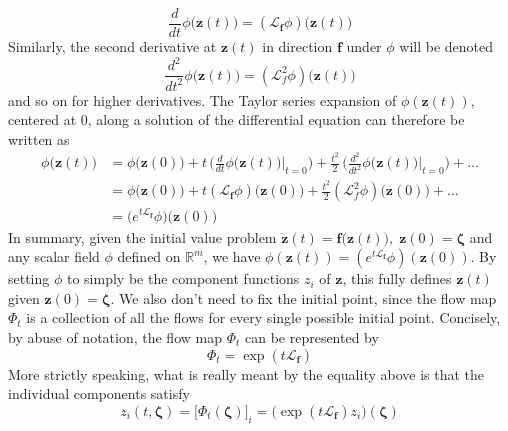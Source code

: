 \documentclass{article}
\begin{document}
      \begin{equation}
        \frac{d}{dt} \phi\big(\mathbf{z}(t)\big) = ( \mathcal{L}_\mathbf{f} \phi) \big(\mathbf{z}(t) \big)
      \end{equation}
      Similarly, the second derivative at $\mathbf{z}(t)$ in direction $\mathbf{f}$ under $\phi$ will be denoted 
      \begin{equation}
        \frac{d^2}{dt^2} \phi\big( \mathbf{z}(t) \big) = (\mathcal{L}_f^2 \phi) \big( \mathbf{z}(t) \big)
      \end{equation}
      and so on for higher derivatives. The Taylor series expansion of $\phi(\mathbf{z}(t))$, centered at $0$, along a solution of the differential equation can therefore be written as 
      \begin{align*}
        \phi \big(\mathbf{z}(t) \big) & = \phi \big(\mathbf{z}(0) \big) + t \, \bigg( \frac{d}{dt} \phi \big( \mathbf{z}(t)\big) \bigg|_{t = 0} \bigg) + \frac{t^2}{2} \, \bigg( \frac{d^2}{dt^2} \phi\big( \mathbf{z}(t)\big) \bigg|_{t = 0} \bigg) + \ldots \\
        & = \phi \big(\mathbf{z}(0) \big) + t (\mathcal{L}_\mathbf{f} \phi) \big( \mathbf{z}(0) \big) + \frac{t^2}{2} ( \mathcal{L}_f^2 \phi) \big( \mathbf{z}(0)\big) + \ldots \\
        & = \big( e^{t \mathcal{L}_\mathbf{f}} \phi) \big( \mathbf{z}(0)\big) 
      \end{align*}
      In summary, given the initial value problem $\mathbf{\dot{z}}(t) = \mathbf{f}\big( \mathbf{z}(t)\big), \; \mathbf{z}(0) = \boldsymbol{\zeta}$ and any scalar field $\phi$ defined on $\mathbb{R}^m$, we have $\phi( \mathbf{z}(t)) = ( e^{t \mathcal{L}_\mathbf{f}} \phi)(\mathbf{z}(0))$. By setting $\phi$ to simply be the component functions $z_i$ of $\mathbf{z}$, this fully defines $\mathbf{z}(t)$ given $\mathbf{z}(0) = \boldsymbol{\zeta}$. We also don't need to fix the initial point, since the flow map $\Phi_t$ is a collection of all the flows for every single possible initial point. Concisely, by abuse of notation, the flow map $\Phi_t$ can be represented by 
      \begin{equation}
        \Phi_t = \exp(t \mathcal{L}_\mathbf{f})
      \end{equation}
      More strictly speaking, what is really meant by the equality above is that the individual components satisfy 
      \begin{equation}
        z_i (t, \boldsymbol{\zeta}) = \big[ \Phi_t (\boldsymbol{\zeta}) \big]_i = \big(\exp(t \mathcal{L}_\mathbf{f}) z_i \big) (\boldsymbol{\zeta})
      \end{equation}
\end{document}

